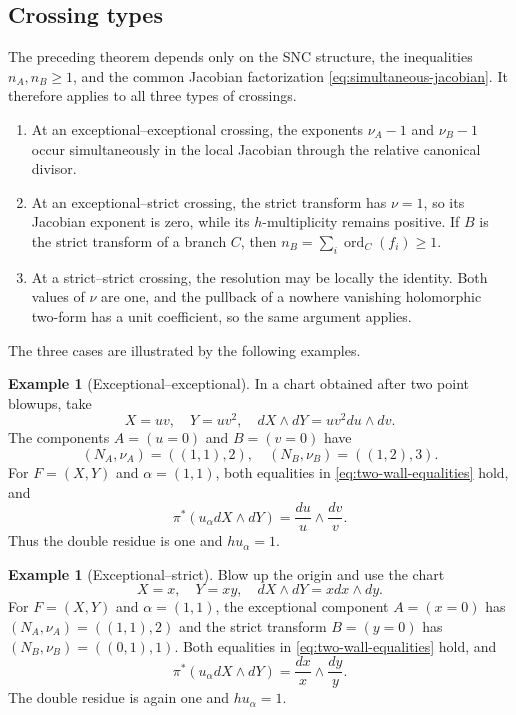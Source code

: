 \documentclass[12pt]{amsart}
\numberwithin{equation}{section}
\theoremstyle{plain}
\theoremstyle{definition}
\newtheorem{example}[theorem]{Example}
\theoremstyle{remark}
\theoremstyle{definition}
\DeclareMathOperator{\ord}{ord}
\begin{document}
\subsection{Crossing types}

The preceding theorem depends only on the SNC structure, the inequalities $n_A,n_B\geq1$, and the common Jacobian factorization \eqref{eq:simultaneous-jacobian}. It therefore applies to all three types of crossings.

\begin{enumerate}[label=\textup{(\roman*)}]
\item At an exceptional--exceptional crossing, the exponents $\nu_A-1$ and $\nu_B-1$ occur simultaneously in the local Jacobian through the relative canonical divisor.
\item At an exceptional--strict crossing, the strict transform has $\nu=1$, so its Jacobian exponent is zero, while its $h$-multiplicity remains positive. If $B$ is the strict transform of a branch $C$, then $n_B=\sum_i\ord_C(f_i)\geq1$.
\item At a strict--strict crossing, the resolution may be locally the identity. Both values of $\nu$ are one, and the pullback of a nowhere vanishing holomorphic two-form has a unit coefficient, so the same argument applies.
\end{enumerate}

The three cases are illustrated by the following examples.

\begin{example}[Exceptional--exceptional]\label{ex:double-exceptional-exceptional}
In a chart obtained after two point blowups, take
\begin{equation*}
X=uv,\quad Y=uv^2,\quad dX\wedge dY=uv^2du\wedge dv.
\end{equation*}
The components $A=(u=0)$ and $B=(v=0)$ have
\begin{equation*}
(N_A,\nu_A)=((1,1),2),\quad (N_B,\nu_B)=((1,2),3).
\end{equation*}
For $F=(X,Y)$ and $\alpha=(1,1)$, both equalities in \eqref{eq:two-wall-equalities} hold, and
\begin{equation*}
\pi^*(u_\alpha dX\wedge dY)=\frac{du}{u}\wedge\frac{dv}{v}.
\end{equation*}
Thus the double residue is one and $hu_\alpha=1$.
\end{example}

\begin{example}[Exceptional--strict]\label{ex:double-exceptional-strict}
Blow up the origin and use the chart
\begin{equation*}
X=x,\quad Y=xy,\quad dX\wedge dY=xdx\wedge dy.
\end{equation*}
For $F=(X,Y)$ and $\alpha=(1,1)$, the exceptional component $A=(x=0)$ has $(N_A,\nu_A)=((1,1),2)$ and the strict transform $B=(y=0)$ has $(N_B,\nu_B)=((0,1),1)$. Both equalities in \eqref{eq:two-wall-equalities} hold, and
\begin{equation*}
\pi^*(u_\alpha dX\wedge dY)=\frac{dx}{x}\wedge\frac{dy}{y}.
\end{equation*}
The double residue is again one and $hu_\alpha=1$.
\end{example}
\end{document}
